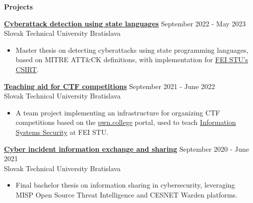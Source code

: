 \documentclass[12pt]{article}
\begin{document}
{{%



\vspace{0.2in} %

\begin{center}
	{\noindent \bfseries Projects}
\end{center}

\vspace{0.1pt}

\noindent
{\bfseries \href{https://opac.crzp.sk/?fn=detailBiblioFormChildU1JSMF&sid=C0DEB8E07572332BAD240C15805F&seo=CRZP-detail-kniha}{Cyberattack detection using state languages} } \hfill September 2022 - May 2023 \\
\noindent Slovak Technical University \hfill Bratislava 
\begin{itemize} \itemsep -2pt %
	\item Master thesis on detecting cyberattacks using state programming languages, based on MITRE ATT\&CK definitions, with implementation for \href{https://csirt.fei.stuba.sk}{FEI STU's CSIRT}.
\end{itemize}

\noindent
{\bfseries \href{https://github.com/feictf/tp_feictf}{Teaching aid for CTF competitions} } \hfill September 2021 - June 2022 \\
\noindent Slovak Technical University \hfill Bratislava 
\begin{itemize} \itemsep -2pt %
	\item A team project implementing an infrastructure for organizing CTF competitions based on the \href{https://pwn.college/}{pwn.college} portal, used to teach \href{https://uim.fei.stuba.sk/predmet/i-bispp/}{Information Systems Security} at FEI STU.
\end{itemize}

\noindent
{\bfseries \href{https://opac.crzp.sk/?fn=DETAILBIBLIOFORMChildCB96V&sid=38F43C5054BC4F7F2DBBCFF31F28&seo=CRZP-detail-kniha}{Cyber incident information exchange and sharing} } \hfill September 2020 - June 2021 \\
\noindent Slovak Technical University \hfill Bratislava 
\begin{itemize} \itemsep -2pt %
	\item Final bachelor thesis on information sharing in cybersecurity, leveraging MISP Open Source Threat Intelligence and CESNET Warden platforms.
\end{itemize}


}}
\end{document}
